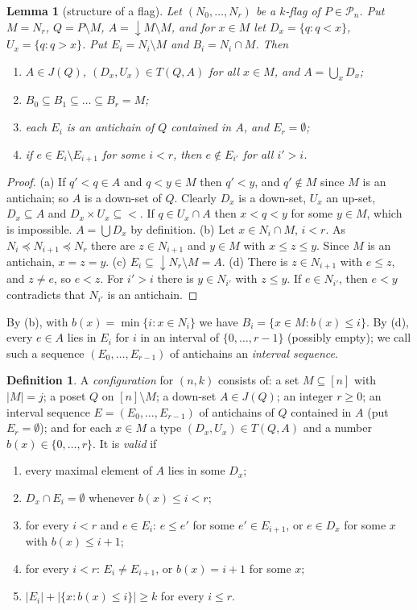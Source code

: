 \documentclass[11pt]{article}
\newtheorem{lemma}[theorem]{Lemma}
\theoremstyle{definition}
\newtheorem{definition}[theorem]{Definition}
\theoremstyle{remark}
\newcommand{\dn}{{\downarrow}}
\newcommand{\cP}{\mathcal{P}}
\begin{document}
\begin{lemma}[structure of a flag]\label{lem:struct}
Let $(N_0,\dots,N_r)$ be a $k$-flag of $P\in\cP_n$. Put $M=N_r$, $Q=P\setminus M$,
$A=\dn M\setminus M$, and for $x\in M$ let $D_x=\{q:q<x\}$, $U_x=\{q:q>x\}$. Put
$E_i=N_i\setminus M$ and $B_i=N_i\cap M$. Then
\begin{enumerate}
\item[(a)] $A\in J(Q)$, $(D_x,U_x)\in T(Q,A)$ for all $x\in M$, and $A=\bigcup_x D_x$;
\item[(b)] $B_0\subseteq B_1\subseteq\dots\subseteq B_r=M$;
\item[(c)] each $E_i$ is an antichain of $Q$ contained in $A$, and $E_r=\emptyset$;
\item[(d)] if $e\in E_i\setminus E_{i+1}$ for some $i<r$, then $e\notin E_{i'}$ for all $i'>i$.
\end{enumerate}
\end{lemma}
\begin{proof}
(a) If $q'<q\in A$ and $q<y\in M$ then $q'<y$, and $q'\notin M$ since $M$ is an antichain;
so $A$ is a down-set of $Q$. Clearly $D_x$ is a down-set, $U_x$ an up-set, $D_x\subseteq A$
and $D_x\times U_x\subseteq{<}$. If $q\in U_x\cap A$ then $x<q<y$ for some $y\in M$,
which is impossible. $A=\bigcup D_x$ by definition.
(b) Let $x\in N_i\cap M$, $i<r$. As $N_i\preceq N_{i+1}\preceq N_r$ there are
$z\in N_{i+1}$ and $y\in M$ with $x\le z\le y$. Since $M$ is an antichain, $x=z=y$.
(c) $E_i\subseteq\dn N_r\setminus M=A$.
(d) There is $z\in N_{i+1}$ with $e\le z$, and $z\ne e$, so $e<z$. For $i'>i$ there is
$y\in N_{i'}$ with $z\le y$. If $e\in N_{i'}$, then $e<y$ contradicts that $N_{i'}$ is an
antichain.
\end{proof}

By (b), with $b(x)=\min\{i:x\in N_i\}$ we have $B_i=\{x\in M:b(x)\le i\}$.
By (d), every $e\in A$ lies in $E_i$ for $i$ in an interval of $\{0,\dots,r-1\}$ (possibly
empty); we call such a sequence $(E_0,\dots,E_{r-1})$ of antichains an
\emph{interval sequence}.

\begin{definition}\label{def:data}
A \emph{configuration} for $(n,k)$ consists of: a set $M\subseteq[n]$ with $|M|=j$; a poset
$Q$ on $[n]\setminus M$; a down-set $A\in J(Q)$; an integer $r\ge0$; an interval sequence
$E=(E_0,\dots,E_{r-1})$ of antichains of $Q$ contained in $A$ (put $E_r=\emptyset$); and
for each $x\in M$ a type $(D_x,U_x)\in T(Q,A)$ and a number $b(x)\in\{0,\dots,r\}$. It is
\emph{valid} if
\begin{enumerate}
\item[(C0)] every maximal element of $A$ lies in some $D_x$;
\item[(C1)] $D_x\cap E_i=\emptyset$ whenever $b(x)\le i<r$;
\item[(C2)] for every $i<r$ and $e\in E_i$: $e\le e'$ for some $e'\in E_{i+1}$, or
            $e\in D_x$ for some $x$ with $b(x)\le i+1$;
\item[(C3)] for every $i<r$: $E_i\ne E_{i+1}$, or $b(x)=i+1$ for some $x$;
\item[(C4)] $|E_i|+|\{x:b(x)\le i\}|\ge k$ for every $i\le r$.
\end{enumerate}
\end{definition}
\end{document}
